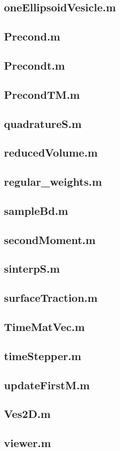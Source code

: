 \subsection{oneEllipsoidVesicle.m}

\subsection{Precond.m}

\subsection{Precondt.m}

\subsection{PrecondTM.m}

\subsection{quadratureS.m}

\subsection{reducedVolume.m}

\subsection{regular\_weights.m}

\subsection{sampleBd.m}

\subsection{secondMoment.m}

\subsection{sinterpS.m}

\subsection{surfaceTraction.m}

\subsection{TimeMatVec.m}

\subsection{timeStepper.m}

\subsection{updateFirstM.m}

\subsection{Ves2D.m}

\subsection{viewer.m}

	